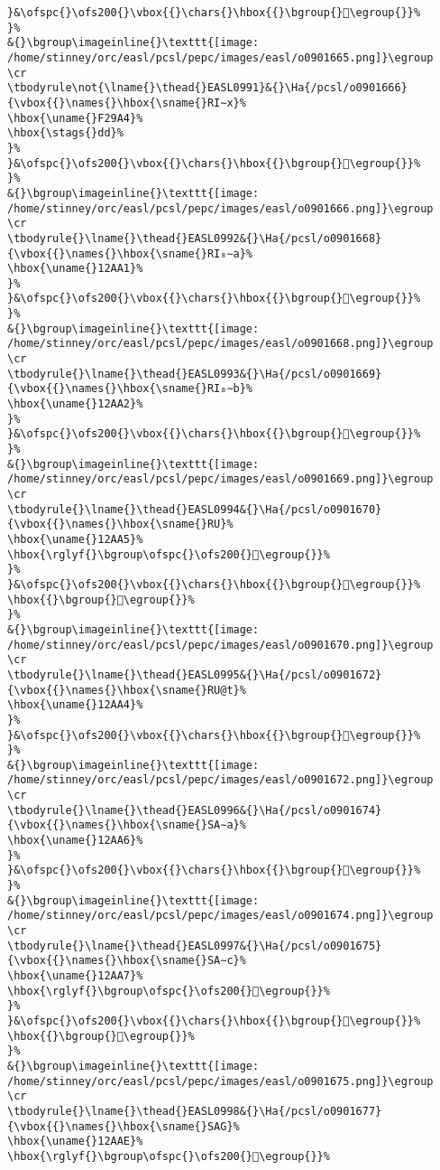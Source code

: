 \begin{verbatim}
}&\ofspc{}\ofs200{}\vbox{{}\chars{}\hbox{{}\bgroup{}󲦣\egroup{}}%
}%
&{}\bgroup\imageinline{}\texttt{[image: /home/stinney/orc/easl/pcsl/pepc/images/easl/o0901665.png]}\egroup
\cr
\tbodyrule\not{\lname{}\thead{}EASL0991}&{}\Ha{/pcsl/o0901666}{\vbox{{}\names{}\hbox{\sname{}RI∼x}%
\hbox{\uname{}F29A4}%
\hbox{\stags{}dd}%
}%
}&\ofspc{}\ofs200{}\vbox{{}\chars{}\hbox{{}\bgroup{}󲦤\egroup{}}%
}%
&{}\bgroup\imageinline{}\texttt{[image: /home/stinney/orc/easl/pcsl/pepc/images/easl/o0901666.png]}\egroup
\cr
\tbodyrule{}\lname{}\thead{}EASL0992&{}\Ha{/pcsl/o0901668}{\vbox{{}\names{}\hbox{\sname{}RI₈∼a}%
\hbox{\uname{}12AA1}%
}%
}&\ofspc{}\ofs200{}\vbox{{}\chars{}\hbox{{}\bgroup{}𒪡\egroup{}}%
}%
&{}\bgroup\imageinline{}\texttt{[image: /home/stinney/orc/easl/pcsl/pepc/images/easl/o0901668.png]}\egroup
\cr
\tbodyrule{}\lname{}\thead{}EASL0993&{}\Ha{/pcsl/o0901669}{\vbox{{}\names{}\hbox{\sname{}RI₈∼b}%
\hbox{\uname{}12AA2}%
}%
}&\ofspc{}\ofs200{}\vbox{{}\chars{}\hbox{{}\bgroup{}𒪢\egroup{}}%
}%
&{}\bgroup\imageinline{}\texttt{[image: /home/stinney/orc/easl/pcsl/pepc/images/easl/o0901669.png]}\egroup
\cr
\tbodyrule{}\lname{}\thead{}EASL0994&{}\Ha{/pcsl/o0901670}{\vbox{{}\names{}\hbox{\sname{}RU}%
\hbox{\uname{}12AA5}%
\hbox{\rglyf{}\bgroup\ofspc{}\ofs200{}𒪥\egroup{}}%
}%
}&\ofspc{}\ofs200{}\vbox{{}\chars{}\hbox{{}\bgroup{}𒪣\egroup{}}%
\hbox{{}\bgroup{}𒪥\egroup{}}%
}%
&{}\bgroup\imageinline{}\texttt{[image: /home/stinney/orc/easl/pcsl/pepc/images/easl/o0901670.png]}\egroup
\cr
\tbodyrule{}\lname{}\thead{}EASL0995&{}\Ha{/pcsl/o0901672}{\vbox{{}\names{}\hbox{\sname{}RU@t}%
\hbox{\uname{}12AA4}%
}%
}&\ofspc{}\ofs200{}\vbox{{}\chars{}\hbox{{}\bgroup{}𒪤\egroup{}}%
}%
&{}\bgroup\imageinline{}\texttt{[image: /home/stinney/orc/easl/pcsl/pepc/images/easl/o0901672.png]}\egroup
\cr
\tbodyrule{}\lname{}\thead{}EASL0996&{}\Ha{/pcsl/o0901674}{\vbox{{}\names{}\hbox{\sname{}SA∼a}%
\hbox{\uname{}12AA6}%
}%
}&\ofspc{}\ofs200{}\vbox{{}\chars{}\hbox{{}\bgroup{}𒪦\egroup{}}%
}%
&{}\bgroup\imageinline{}\texttt{[image: /home/stinney/orc/easl/pcsl/pepc/images/easl/o0901674.png]}\egroup
\cr
\tbodyrule{}\lname{}\thead{}EASL0997&{}\Ha{/pcsl/o0901675}{\vbox{{}\names{}\hbox{\sname{}SA∼c}%
\hbox{\uname{}12AA7}%
\hbox{\rglyf{}\bgroup\ofspc{}\ofs200{}𒪧\egroup{}}%
}%
}&\ofspc{}\ofs200{}\vbox{{}\chars{}\hbox{{}\bgroup{}𒪧\egroup{}}%
\hbox{{}\bgroup{}𒪨\egroup{}}%
}%
&{}\bgroup\imageinline{}\texttt{[image: /home/stinney/orc/easl/pcsl/pepc/images/easl/o0901675.png]}\egroup
\cr
\tbodyrule{}\lname{}\thead{}EASL0998&{}\Ha{/pcsl/o0901677}{\vbox{{}\names{}\hbox{\sname{}SAG}%
\hbox{\uname{}12AAE}%
\hbox{\rglyf{}\bgroup\ofspc{}\ofs200{}𒪮\egroup{}}%

\end{verbatim}
